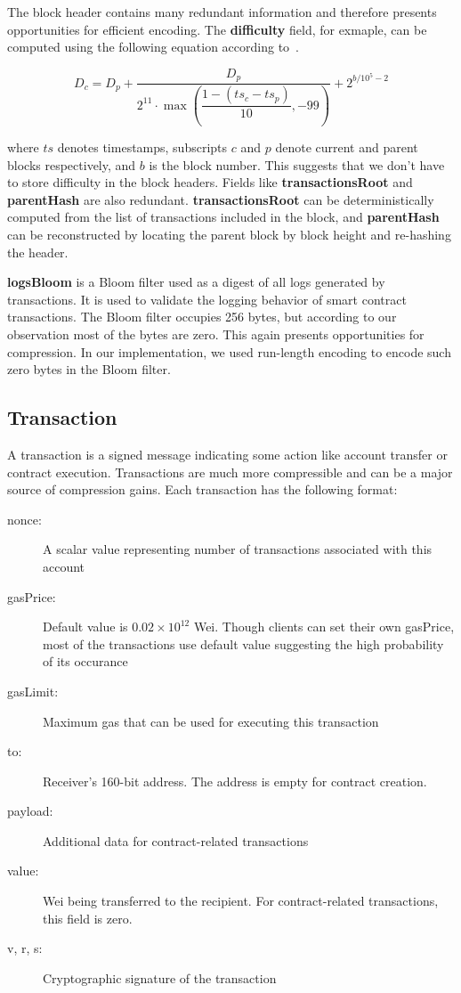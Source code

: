 The block header contains many redundant information and therefore presents opportunities for efficient encoding.
The \textbf{difficulty} field, for exmaple, can be computed using the following equation according to~\cite{ethereum}.

$$
D_{c} = D_{p} + \dfrac{D_{p}}{2^{11}\cdot\max\left(\dfrac{1 - (ts_{c} - ts_{p})}{10}, -99\right)} + 2^{b/10^5-2}
$$

where $ts$ denotes timestamps, subscripts $c$ and $p$ denote current and parent blocks respectively, and $b$ is the block number.
This suggests that we don't have to store difficulty in the block headers.
Fields like \textbf{transactionsRoot} and \textbf{parentHash} are also redundant.
\textbf{transactionsRoot} can be deterministically computed from the list of transactions included in the block,
and \textbf{parentHash} can be reconstructed by locating the parent block by block height and re-hashing the header.

\textbf{logsBloom} is a Bloom filter used as a digest of all logs generated by transactions.
It is used to validate the logging behavior of smart contract transactions. The Bloom filter occupies 256 bytes,
but according to our observation most of the bytes are zero. This again presents opportunities for compression.
In our implementation, we used run-length encoding to encode such zero bytes in the Bloom filter.

\subsection{Transaction}

A transaction is a signed message indicating some action like account transfer or contract execution.
Transactions are much more compressible and can be a major source of compression gains.
Each transaction has the following format:
\begin{description}
  \item[nonce:] A scalar value representing number of transactions associated with this account
  \item[gasPrice:] Default value is $0.02\times10^{12}$ Wei. Though clients can set their own gasPrice, most of the transactions use default value suggesting the high probability of its occurance
  \item[gasLimit:] Maximum gas that can be used for executing this transaction
  \item[to:] Receiver's 160-bit address. The address is empty for contract creation.
  \item[payload:] Additional data for contract-related transactions
  \item[value:] Wei being transferred to the recipient. For contract-related transactions, this field is zero.
  \item[v, r, s:] Cryptographic signature of the transaction
\end{description}

